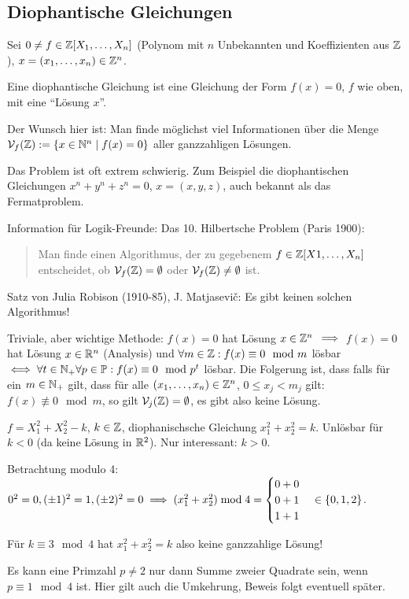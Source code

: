 \documentclass[a4paper,DIV15,BCOR12mm]{article}
\begin{document}
\subsection{Diophantische Gleichungen}
Sei $0\ne f \in \mathbb{Z}[X_1,\ldots,X_n]$ (Polynom mit $n$ Unbekannten
und Koeffizienten aus $\mathbb{Z}$), $x=(x_1,\ldots,x_n)\in\mathbb{Z}^n$.

Eine diophantische Gleichung ist eine Gleichung der Form $f(x)=0$,
$f$ wie oben, mit eine "`Lösung $x$"'.

Der Wunsch hier ist: Man finde möglichst viel Informationen über die
Menge $\mathcal{V}_f(\mathbb{Z}) := \{ x\in\mathbb{N}^n \mid f(x) = 0\}$ aller
ganzzahligen Lösungen.

Das Problem ist oft extrem schwierig. Zum Beispiel die
diophantischen Gleichungen $x^n+y^n+z^n=0$, $x=(x,y,z)$, auch
bekannt als das Fermatproblem.

Information für Logik-Freunde: Das 10. Hilbertsche Problem (Paris
1900):
\begin{quote}
Man finde einen Algorithmus, der zu gegebenem $f\in
\mathbb{Z}[X1,\ldots,X_n]$ entscheidet, ob $\mathcal{V}_f(\mathbb{Z}) =
\emptyset$ oder $\mathcal{V}_f(\mathbb{Z}) \ne \emptyset$ ist.
\end{quote}
Satz von Julia Robison (1910-85), J. Matjasevi\v{c}: Es gibt keinen
solchen Algorithmus!

Triviale, aber wichtige Methode: $f(x)=0$ hat Lösung $x\in\mathbb{Z}^n$
$\implies$ $f(x)=0$ hat Lösung $x \in \mathbb{R}^n$ (Analysis) und $\forall
m \in \mathbb{Z}: f(x) \equiv 0 \mod m$ lösbar $\iff \forall t \in \mathbb{N}_+
\forall p\in\mathbb{P}: f(x) \equiv 0 \mod p^t$ lösbar. Die Folgerung ist,
dass falls für ein $m\in\mathbb{N}_+$ gilt, dass für alle
$(x_1,\ldots,x_n)\in\mathbb{Z}^n$, $0\le x_j < m_j$ gilt: $f(x)\not\equiv
0 \mod m$, so gilt $\mathcal{V}_j(\mathbb{Z})= \emptyset$, es gibt also
keine Lösung.

\begin{beispiel}
$f=X_1^2 + X_2^2 - k$, $k\in\mathbb{Z}$, diophanischsche Gleichung $x_1^2
+ x_2^2 = k$. Unlösbar für $k<0$ (da keine Lösung in $\mathbb{R}^2$). Nur
interessant: $k>0$.

Betrachtung modulo 4:\\ $0^2 = 0, (\pm1)^2 = 1, (\pm2)^2= 0 \implies
(x_1^2 + x_2^2) \bmod 4 =
\begin{cases}
0+0 \\ 0+1 \\ 1+1
\end{cases} \in \{0,1,2\}$.

Für $k\equiv 3 \mod 4$ hat $x_1^2 + x_2^2 = k$ also keine
ganzzahlige Lösung!

Es kann eine Primzahl $p\ne 2$ nur dann Summe zweier Quadrate sein,
wenn $p\equiv 1 \mod 4$ ist. Hier gilt auch die Umkehrung, Beweis
folgt eventuell später.
\end{beispiel}
\end{document}
